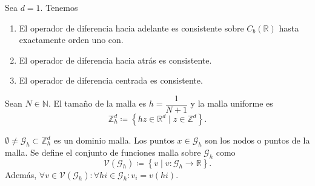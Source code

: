 \begin{proposition}[Consistencia]
    Sea $d=1$. Tenemos
    \begin{enumerate}
        \item

              El operador de diferencia hacia adelante es consistente
              sobre
              \begin{math}
                  C_{b}\left(\mathbb{R}\right)
              \end{math}
              hasta exactamente orden uno con.

        \item

              El operador de diferencia hacia atrás es consistente.

        \item

              El operador de diferencia centrada es consistente.
    \end{enumerate}
\end{proposition}

\begin{definition}
    Sean $N\in\mathbb{N}$.
    El tamaño de la malla es
    \begin{math}
        h=
        \dfrac{1}{N+1}
    \end{math}
    y la malla uniforme es
    \begin{equation*}
        \mathbb{Z}^{d}_{h}\coloneqq
        \left\{
        hz\in\mathbb{R}^{d}\mid
        z\in\mathbb{Z}^{d}
        \right\}.
    \end{equation*}
\end{definition}

\begin{definition}
    \begin{math}
        \emptyset\neq\mathcal{G}_{h}\subset
        \mathbb{Z}^{d}_{h}
    \end{math}
    es un dominio malla.
    Los puntos $x\in\mathcal{G}_{h}$ son los nodos o puntos de la
    malla.
    Se define el conjunto de funciones malla sobre $\mathcal{G}_{h}$
    como
    \begin{equation*}
        \mathcal{V}
        \left(\mathcal{G}_{h}\right)\coloneqq
        \left\{
        v\mid v\colon\mathcal{G}_{h}\to\mathbb{R}
        \right\}.
    \end{equation*}
    Además,
    \begin{math}
        \forall v\in\mathcal{V}\left(\mathcal{G}_{h}\right):
        \forall hi\in\mathcal{G}_{h}:
        v_{i}=
        v\left(hi\right)
    \end{math}.
\end{definition}

